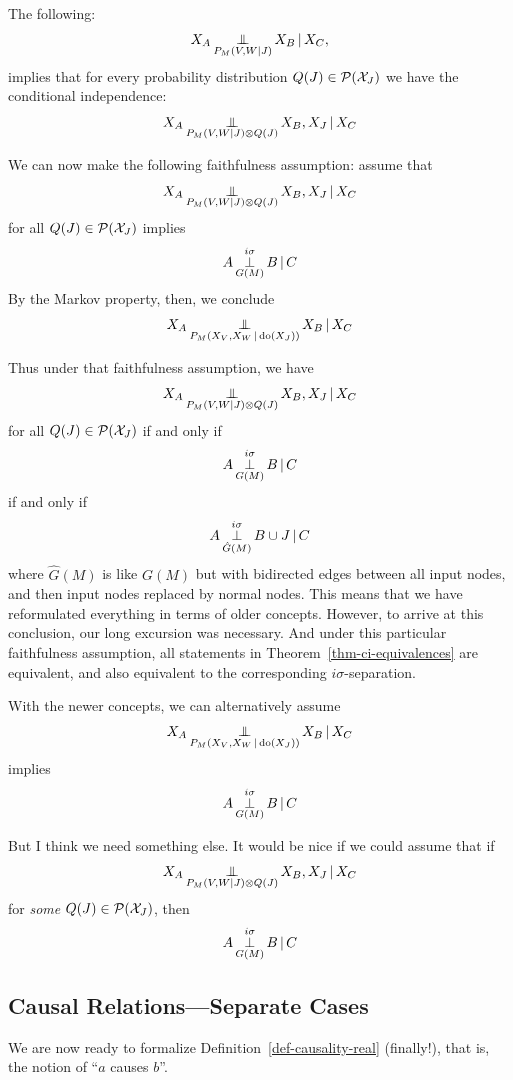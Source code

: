 The following:
$$X_A \operatorname*{\perp\mkern-11mu\perp}_{P_{M}(V,W|J)} X_B \operatorname*{|} X_C,$$
implies that for every probability distribution $Q(J) \in \mathcal{P}(\mathcal{X}_{J})$ we have the conditional independence:
\[ X_A \operatorname*{\perp\mkern-11mu\perp}_{P_{M}(V,W|J)\otimes Q(J)} X_B,X_J \operatorname*{|} X_C\]

We can now make the following faithfulness assumption:
assume that
\[ X_A \operatorname*{\perp\mkern-11mu\perp}_{P_{M}(V,W|J)\otimes Q(J)} X_B, X_J \operatorname*{|} X_C\]
for all $Q(J) \in \mathcal{P}(\mathcal{X}_{J})$ 
implies
\[ A \operatorname*{\perp}^{i\sigma}_{G(M)} B \operatorname*{|} C\]
By the Markov property, then, we conclude
  $$X_A \operatorname*{\perp\mkern-11mu\perp}_{P_{M}(X_V,X_W \operatorname*{|} \operatorname{do}(X_{J}))} X_B \operatorname*{|} X_C$$

Thus under that faithfulness assumption, we have
\[ X_A \operatorname*{\perp\mkern-11mu\perp}_{P_{M}(V,W|J)\otimes Q(J)} X_B,X_J \operatorname*{|} X_C\]
for all $Q(J) \in \mathcal{P}(\mathcal{X}_{J})$ if and only if
\[ A \operatorname*{\perp}^{i\sigma}_{G(M)} B \operatorname*{|} C\]
if and only if
\[ A \operatorname*{\perp}^{i\sigma}_{\hat{G}(M)} B \cup J \operatorname*{|} C\]
where $\hat{G}(M)$ is like $G(M)$ but with bidirected edges between all input nodes,
and then input nodes replaced by normal nodes. This means that we have reformulated 
everything in terms of older concepts. However, to arrive at this conclusion, our long
excursion was necessary. And under this particular faithfulness assumption, all statements
in Theorem~\ref{thm-ci-equivalences} are equivalent, and also equivalent to the 
corresponding $i\sigma$-separation.

With the newer concepts, we can alternatively assume
  $$X_A \operatorname*{\perp\mkern-11mu\perp}_{P_{M}(X_V,X_W \operatorname*{|} \operatorname{do}(X_{J}))} X_B \operatorname*{|} X_C$$
implies
\[ A \operatorname*{\perp}^{i\sigma}_{G(M)} B \operatorname*{|} C\]

But I think we need something else. It would be nice if we could assume that if
\[ X_A \operatorname*{\perp\mkern-11mu\perp}_{P_{M}(V,W|J)\otimes Q(J)} X_B, X_J \operatorname*{|} X_C\]
for \emph{some} $Q(J) \in \mathcal{P}(\mathcal{X}_{J})$, then
\[ A \operatorname*{\perp}^{i\sigma}_{G(M)} B \operatorname*{|} C\]

\subsection{Causal Relations---Separate Cases}

We are now ready to formalize Definition~\ref{def-causality-real} (finally!), that is, the notion of ``$a$ causes $b$''.


